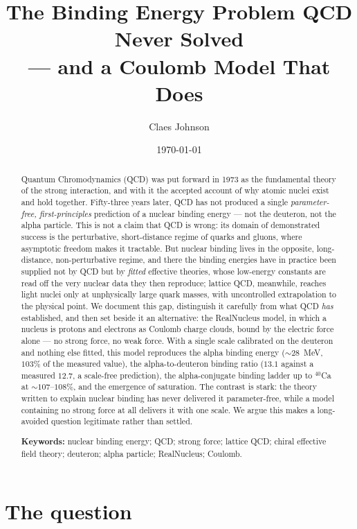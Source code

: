 \documentclass[11pt]{article}
\title{The Binding Energy Problem QCD Never Solved\\ --- and a Coulomb Model That Does}
\author[1]{Claes Johnson}
\affil[1]{KTH Royal Institute of Technology, SE-100 44 Stockholm, Sweden \\
\texttt{claesjohnson@gmail.com}}
\date{\today}
\begin{document}
\maketitle

\begin{abstract}
Quantum Chromodynamics (QCD) was put forward in 1973 as the fundamental theory of the strong
interaction, and with it the accepted account of why atomic nuclei exist and hold together. Fifty-three
years later, QCD has not produced a single \emph{parameter-free, first-principles} prediction of a
nuclear binding energy --- not the deuteron, not the alpha particle. This is not a claim that QCD is
wrong: its domain of demonstrated success is the perturbative, short-distance regime of quarks and
gluons, where asymptotic freedom makes it tractable. But nuclear binding lives in the opposite,
long-distance, non-perturbative regime, and there the binding energies have in practice been supplied not
by QCD but by \emph{fitted} effective theories, whose low-energy constants are read off the very nuclear
data they then reproduce; lattice QCD, meanwhile, reaches light nuclei only at unphysically large quark
masses, with uncontrolled extrapolation to the physical point. We document this gap, distinguish it
carefully from what QCD \emph{has} established, and then set beside it an alternative: the RealNucleus
model, in which a nucleus is protons and electrons as Coulomb charge clouds, bound by the electric force
alone --- no strong force, no weak force. With a single scale calibrated on the deuteron and nothing else
fitted, this model reproduces the alpha binding energy ($\sim 28$~MeV, $103\%$ of the measured value), the
alpha-to-deuteron binding ratio ($13.1$ against a measured $12.7$, a scale-free prediction), the
alpha-conjugate binding ladder up to ${}^{40}$Ca at $\sim 107$--$108\%$, and the emergence of saturation. The contrast is stark: the theory
written to explain nuclear binding has never delivered it parameter-free, while a model containing no
strong force at all delivers it with one scale. We argue this makes a long-avoided question legitimate
rather than settled.

\medskip
\noindent\textbf{Keywords:} nuclear binding energy; QCD; strong force; lattice QCD; chiral effective
field theory; deuteron; alpha particle; RealNucleus; Coulomb.
\end{abstract}

\doublespacing

\section{The question}
\label{sec:question}
\end{document}
